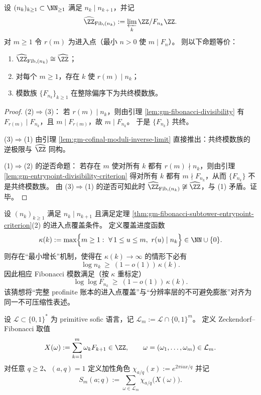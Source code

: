 \begin{theorem}\label{thm:gm-fibonacci-subtower-entrypoint-criterion}
设 \((n_k)_{k\ge 1}\subset\NN_{\ge 1}\) 满足 \(n_k\mid n_{k+1}\)，并记
\[
\widehat{\ZZ}_{\mathrm{Fib},(n_k)}:=\varprojlim_k \ZZ/F_{n_k}\ZZ.
\]
对 \(m\ge 1\) 令 \(r(m)\) 为进入点（最小 \(n>0\) 使 \(m\mid F_n\)）。
则以下命题等价：
\begin{enumerate}
  \item \(\widehat{\ZZ}_{\mathrm{Fib},(n_k)}\cong\widehat{\ZZ}\)；
  \item 对每个 \(m\ge 1\)，存在 \(k\) 使 \(r(m)\mid n_k\)；
  \item 模数族 \(\{F_{n_k}\}_{k\ge 1}\) 在整除偏序下为共终模数族。
\end{enumerate}
\end{theorem}
\begin{proof}
(2)\(\Rightarrow\)(3)：
若 \(r(m)\mid n_k\)，则由引理 \ref{lem:gm-fibonacci-divisibility} 有 \(F_{r(m)}\mid F_{n_k}\)，且 \(m\mid F_{r(m)}\)，故 \(m\mid F_{n_k}\)。
于是 \(\{F_{n_k}\}\) 共终。
\par
(3)\(\Rightarrow\)(1) 由引理 \ref{lem:gm-cofinal-moduli-inverse-limit} 直接推出：共终模数族的逆极限与 \(\widehat{\ZZ}\) 同构。
\par
(1)\(\Rightarrow\)(2) 的逆否命题：
若存在 \(m\) 使对所有 \(k\) 都有 \(r(m)\nmid n_k\)，则由引理 \ref{lem:gm-entrypoint-divisibility-criterion} 得对所有 \(k\) 都有 \(m\nmid F_{n_k}\)，从而 \(\{F_{n_k}\}\) 不是共终模数族。
由 (3)\(\Rightarrow\)(1) 的逆否可知此时 \(\widehat{\ZZ}_{\mathrm{Fib},(n_k)}\not\cong \widehat{\ZZ}\)，与 (1) 矛盾。证毕。
\end{proof}

\begin{conjecture}[进入点覆盖链的最小增长与不可压缩性]\label{conj:gm-entrypoint-min-growth}
设 \((n_k)_{k\ge 1}\) 满足 \(n_k\mid n_{k+1}\) 且满足定理 \ref{thm:gm-fibonacci-subtower-entrypoint-criterion}(2) 的进入点覆盖条件。
定义覆盖进度函数
\[
\kappa(k):=\max\Bigl\{m\ge 1:\ \forall\,1\le u\le m,\ r(u)\mid n_k\Bigr\}\in\NN\cup\{0\}.
\]
则存在“最小增长”机制，使得在 \(\kappa(k)\to\infty\) 的情形下必有
\[
\log n_k\ \ge\ (1-o(1))\,\kappa(k).
\]
因此相应 Fibonacci 模数满足（按 \(\kappa\) 重标定）
\[
\log\log F_{n_k}\ \ge\ (1-o(1))\,\kappa(k).
\]
该猜想将“完整 profinite 账本的进入点覆盖”与“分辨率层的不可避免膨胀”对齐为同一不可压缩性表述。
\end{conjecture}

设 \(\mathcal{L}\subset\{0,1\}^\ast\) 为 primitive sofic 语言，记 \(\mathcal{L}_m:=\mathcal{L}\cap\{0,1\}^m\)。
定义 Zeckendorf--Fibonacci 取值
\[
X(\omega):=\sum_{k=1}^{m}\omega_k F_{k+1}\in\ZZ,
\qquad \omega=(\omega_1,\dots,\omega_m)\in\mathcal{L}_m.
\]
对任意 \(q\ge 2\)、\((a,q)=1\) 定义加性角色 \(\chi_{a/q}(x):=e^{2\pi i ax/q}\) 并记
\[
S_m(a;q):=\sum_{\omega\in\mathcal{L}_m}\chi_{a/q}\!\bigl(X(\omega)\bigr).
\]

